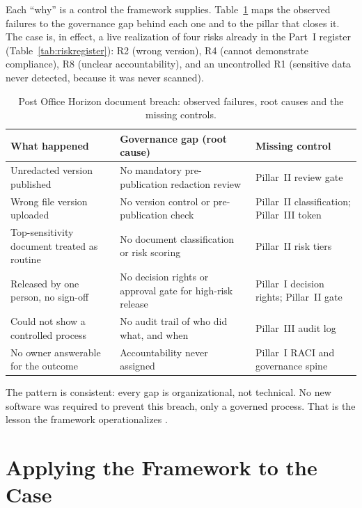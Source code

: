 \documentclass[12pt,a4paper]{article}
\begin{document}
Each ``why'' is a control the framework supplies. Table~\ref{tab:rootcause} maps the observed failures to the governance gap behind each one and to the pillar that closes it. The case is, in effect, a live realization of four risks already in the Part~I register (Table~\ref{tab:riskregister}): R2 (wrong version), R4 (cannot demonstrate compliance), R8 (unclear accountability), and an uncontrolled R1 (sensitive data never detected, because it was never scanned).

\begin{table}[H]
\centering
\small
{}
\begin{tabular}{@{} p{4.4cm} p{5.4cm} p{3.8cm} @{}}
\toprule
\textbf{\color{accentdark}What happened} & \textbf{\color{accentdark}Governance gap (root cause)} & \textbf{\color{accentdark}Missing control} \\
\midrule
Unredacted version published & No mandatory pre-publication redaction review & Pillar~II review gate \\
Wrong file version uploaded & No version control or pre-publication check & Pillar~II classification; Pillar~III token \\
Top-sensitivity document treated as routine & No document classification or risk scoring & Pillar~II risk tiers \\
Released by one person, no sign-off & No decision rights or approval gate for high-risk release & Pillar~I decision rights; Pillar~II gate \\
Could not show a controlled process & No audit trail of who did what, and when & Pillar~III audit log \\
No owner answerable for the outcome & Accountability never assigned & Pillar~I RACI and governance spine \\
\bottomrule
\end{tabular}
\caption{Post Office Horizon document breach: observed failures, root causes and the missing controls.}
\label{tab:rootcause}
\end{table}

The pattern is consistent: every gap is organizational, not technical. No new software was required to prevent this breach, only a governed process. That is the lesson the framework operationalizes \cite{falchi_slides}.

\section{Applying the Framework to the Case}
\label{sec:apply_framework}
\end{document}
